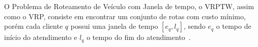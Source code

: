 O Problema de Roteamento de Veículo com Janela de tempo, o \ac{VRPTW}, assim como o \ac{VRP}, consiste em encontrar um conjunto de rotas com custo mínimo, porém cada cliente $q$ possui uma janela de tempo $[e_{q}, l_{q}]$, sendo $e_{q}$ o tempo de início do atendimento e $l_{q}$ o tempo do fim do atendimento~\cite{gold:2008}.